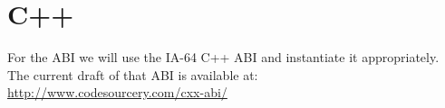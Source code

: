 \section{C++\label{section-cpp}}

For the  ABI we will use the IA-64 C++ ABI and instantiate it
appropriately.  The current draft of that ABI is available at:\\
\url{http://www.codesourcery.com/cxx-abi/}


